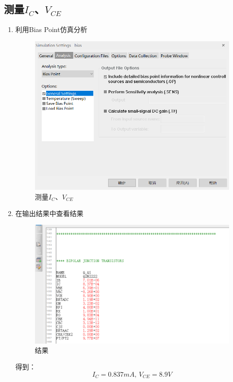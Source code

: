 \documentclass{../source/Experiment}
\begin{document}
        \subsection{测量$I_C$、$V_{CE}$}
            \begin{enumerate}
                \item 利用Bias Point仿真分析
                    \begin{figure}[h]
                        \centering
                        \includegraphics[scale = 0.6]{pic/仿真1}
                        \caption{测量$I_C$、$V_{CE}$}
                    \end{figure}
                \item 在输出结果中查看结果
                    \newpage
                    \begin{figure}[h]
                        \centering
                        \includegraphics[scale = 0.8]{pic/结果1}
                        \caption{结果}
                    \end{figure}
                    得到：
                    $$I_C = 0.837mA,\, V_{CE} = 8.9V$$
            \end{enumerate}
\end{document}
